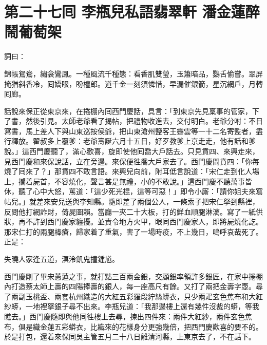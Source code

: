
\chapter*{第二十七囘 李瓶兒私語翡翠軒 潘金蓮醉鬧葡萄架}


詞曰：

\begin{myquote}
錦帳鴛鴦，繡衾鸞鳳。一種風流千種態：看香肌雙瑩，玉簫暗品，鸚舌偷嘗。翠屏掩猶斜香冷，囘嬌眼，盼檀郎。道千金一刻須憐惜，早漏催銀箭，星沉網戶，月轉囘廊。

\end{myquote}

話說來保正從東京來，在捲棚內囘西門慶話，具言：「到東京先見稟事的管家，下了書，然後引見。太師老爺看了揭帖，把禮物收進去，交付明白。老爺分咐：不日寫書，馬上差人下與山東巡按侯爺，把山東滄州鹽客王霽雲等一十二名寄監者，盡行釋放。翟叔多上覆爹：老爺壽誕六月十五日，好歹教爹上京走走，他有話和爹說。」這西門慶聽了，滿心歡喜，旋即使他囘喬大戶話去。只見賁四、來興走來，見西門慶和來保說話，立在旁邊。來保便徃喬大戶家去了。西門慶問賁四：「你每燒了囘來了？」那賁四不敢言語。來興兒向前，附耳低言說道：「宋仁走到化人場上，攔着屍首，不容燒化，聲言甚是無禮，小的不敢說。」這西門慶不聽萬事皆休，聽了心中大怒，罵道：「這少死光棍，這等可惡！」即令小厮：「請你姐夫來寫帖兒。」就差來安兒送與李知縣。隨即差了兩個公人，一條索子把宋仁拏到縣裡，反問他打網詐財，倚屍圖賴。{}當廳一夾二十大板，打的鮮血順腿淋漓。寫了一紙供狀，再不許到西門慶家纏擾。並責令地方火甲，眼同西門慶家人，即將屍燒化訖。那宋仁打的兩腿棒瘡，歸家着了重氣，害了一場時疫，不上幾日，嗚呼哀哉死了。正是：

\begin{myquote}
失曉人家逢五道，溟泠飢鬼撞鍾馗。
\end{myquote}

西門慶剛了畢宋蕙蓮之事，就打點三百兩金銀，交顧銀率領許多銀匠，在家中捲棚內打造蔡太師上壽的四陽捧壽的銀人，每一座高尺有餘。又打了兩把金壽字壺。尋了兩副玉桃盃、兩套杭州織造的大紅五彩羅段紵絲蟒衣，只少兩疋玄色焦布和大紅紗蟒，一地裡拏銀子尋不出來。李瓶兒道：「我那邊樓上還有幾件沒裁的蟒，等我瞧去。」{}西門慶隨即與他同徃樓上去尋，揀出四件來：兩件大紅紗，兩件玄色焦布，俱是織金蓮五彩蟒衣，比織來的花樣身分更強幾倍，把西門慶歡喜的要不的。於是打包，還着來保同吳主管五月二十八日離清河縣，上東京去了，不在話下。

